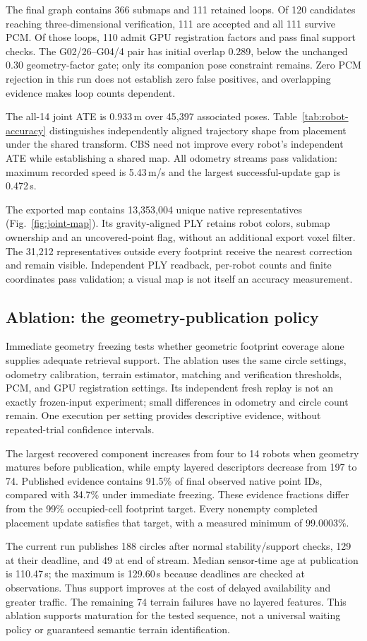 The final graph contains 366 submaps and 111 retained loops. Of 120 candidates reaching three-dimensional verification, 111 are accepted and all 111 survive PCM. Of those loops, 110 admit GPU registration factors and pass final support checks. The G02/26--G04/4 pair has initial overlap 0.289, below the unchanged 0.30 geometry-factor gate; only its companion pose constraint remains. Zero PCM rejection in this run does not establish zero false positives, and overlapping evidence makes loop counts dependent.

The all-14 joint ATE is 0.933\,m over 45,397 associated poses. Table~\ref{tab:robot-accuracy} distinguishes independently aligned trajectory shape from placement under the shared transform. CBS need not improve every robot's independent ATE while establishing a shared map. All odometry streams pass validation: maximum recorded speed is 5.43\,m/s and the largest successful-update gap is 0.472\,s.


The exported map contains 13,353,004 unique native representatives (Fig.~\ref{fig:joint-map}). Its gravity-aligned PLY retains robot colors, submap ownership and an uncovered-point flag, without an additional export voxel filter. The 31,212 representatives outside every footprint receive the nearest correction and remain visible. Independent PLY readback, per-robot counts and finite coordinates pass validation; a visual map is not itself an accuracy measurement.

\subsection{Ablation: the geometry-publication policy}
\label{sec:ablation}
Immediate geometry freezing tests whether geometric footprint coverage alone supplies adequate retrieval support. The ablation uses the same circle settings, odometry calibration, terrain estimator, matching and verification thresholds, PCM, and GPU registration settings. Its independent fresh replay is not an exactly frozen-input experiment; small differences in odometry and circle count remain. One execution per setting provides descriptive evidence, without repeated-trial confidence intervals.


The largest recovered component increases from four to 14 robots when geometry matures before publication, while empty layered descriptors decrease from 197 to 74. Published evidence contains 91.5\% of final observed native point IDs, compared with 34.7\% under immediate freezing. These evidence fractions differ from the 99\% occupied-cell footprint target. Every nonempty completed placement update satisfies that target, with a measured minimum of 99.0003\%.

The current run publishes 188 circles after normal stability/support checks, 129 at their deadline, and 49 at end of stream. Median sensor-time age at publication is 110.47\,s; the maximum is 129.60\,s because deadlines are checked at observations. Thus support improves at the cost of delayed availability and greater traffic. The remaining 74 terrain failures have no layered features. This ablation supports maturation for the tested sequence, not a universal waiting policy or guaranteed semantic terrain identification.
\FloatBarrier
